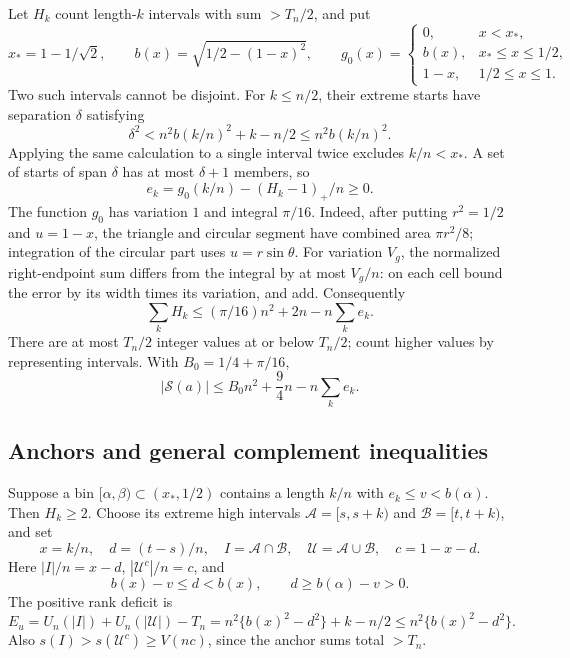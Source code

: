 \documentclass[10pt]{amsart}
\theoremstyle{remark}
\newcommand{\Sset}{\mathcal S}
\newcommand{\Uset}{\mathcal U}
\newcommand{\Bset}{\mathcal B}
\newcommand{\Aset}{\mathcal A}
\begin{document}
Let $H_k$ count length-$k$ intervals with sum $>T_n/2$, and put
\[
 x_*=1-1/\sqrt2,\qquad b(x)=\sqrt{1/2-(1-x)^2},
 \qquad
 g_0(x)=\begin{cases}
 0,&x<x_*,\\ b(x),&x_*\le x\le1/2,\\1-x,&1/2\le x\le1.
 \end{cases}
\]
Two such intervals cannot be disjoint. For $k\le n/2$, their extreme
starts have separation $\delta$ satisfying
\[
 \delta^2<n^2 b(k/n)^2+k-n/2\le n^2b(k/n)^2.
\]
Applying the same calculation to a single interval twice excludes
$k/n<x_*$. A set of starts of span $\delta$ has at most $\delta+1$
members, so
\[
 e_k=g_0(k/n)-(H_k-1)_+/n\ge0.
\]
The function $g_0$ has variation $1$ and integral $\pi/16$.
Indeed, after putting $r^2=1/2$ and $u=1-x$, the triangle and circular
segment have combined area $\pi r^2/8$; integration of the circular
part uses $u=r\sin\theta$. For variation $V_g$, the normalized
right-endpoint sum differs from the integral by at most $V_g/n$:
on each cell bound the error by its width times its variation, and add.
Consequently
\[
 \sum_k H_k\le(\pi/16)n^2+2n-n\sum_ke_k.
\]
There are at most $T_n/2$ integer values at or below $T_n/2$; count
higher values by representing intervals. With $B_0=1/4+\pi/16$,
\begin{equation}\label{eq:baseline}
 |\Sset(a)|\le B_0n^2+\frac94n-n\sum_ke_k.
\end{equation}

\subsection{Anchors and general complement inequalities}
Suppose a bin $[\alpha,\beta)\subset(x_*,1/2)$ contains a length $k/n$
with $e_k\le v<b(\alpha)$. Then $H_k\ge2$. Choose its extreme high
intervals $\Aset=[s,s+k)$ and $\Bset=[t,t+k)$, and set
\[
 x=k/n,\quad d=(t-s)/n,\quad I=\Aset\cap\Bset,\quad
 \Uset=\Aset\cup\Bset,\quad c=1-x-d.
\]
Here $|I|/n=x-d$, $|\Uset^c|/n=c$, and
\[
 b(x)-v\le d<b(x),\qquad d\ge b(\alpha)-v>0.
\]
The positive rank deficit is
\begin{equation}\label{eq:rankdef}
 E_u=U_n(|I|)+U_n(|\Uset|)-T_n
 =n^2\{b(x)^2-d^2\}+k-n/2
 \le n^2\{b(x)^2-d^2\}.
\end{equation}
Also $s(I)>s(\Uset^c)\ge V(nc)$, since the anchor sums total $>T_n$.
\end{document}
